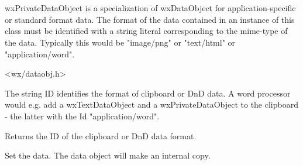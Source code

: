 \section{}\label{wxprivatedataobject}

wxPrivateDataObject is a specialization of wxDataObject for application-specific or standard
format data. The format of the data contained in an instance of this class must be identified
with a string literal corresponding to the mime-type of the data. Typically this would be
"image/png" or "text/html" or "application/word".




<wx/dataobj.h>




\label{wxprivatedataobjectwxprivatedataobject}


\label{wxprivatedataobjectdtor}


\label{wxprivatedataobjectsetid}


The string ID identifies the format of clipboard or DnD data. A word
processor would e.g. add a wxTextDataObject and a wxPrivateDataObject
to the clipboard - the latter with the Id "application/word".

\label{wxprivatedataobjectgetid}


Returns the ID of the clipboard or DnD data format.

\label{wxprivatedataobjectsetdata}


Set the data. The data object will make an internal copy.


